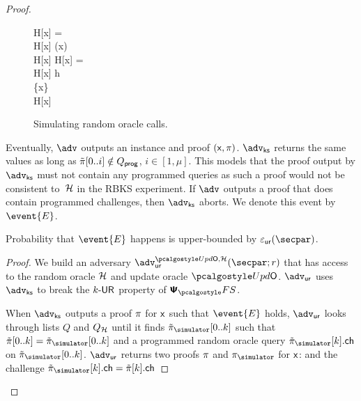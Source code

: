 \begin{proof}
	
	\begin{figure}
		\centering
			\begin{pcvstack}
			\begin{pchstack}
				{
				\pcif H[x] = \bot \pcthen \\
				\pcind H[x] \gets \ro(x) \\
				\pcreturn H[x]
		  		}
				\pchspace
				{ 
					\pcif H[x] = \bot \pcthen \\ 
					\pcind H[x] \gets h \\
					\pcind \Qprog \gets \Qprog \cup \{x\}\\
					\pcreturn H[x]
				}
			\end{pchstack}
		\end{pcvstack}
		\caption{Simulating random oracle calls.}
		\label{fig:simulator_oracles}
	\end{figure}	
%

	Eventually, $\advse$ outputs an instance and proof $(\mathsf{x}, \pi)$. $\advcss$ returns the same values as long as $\tilde{\pi}[0..i] \notin Q_{\mathsf{prog}}$, $i\in[1,\mu]$. This models that the proof output by $\advcss$ must not contain any programmed queries as such a proof would not be consistent to~$\mathcal{H}$ in the RBKS experiment. If $\advse$ outputs a proof that does contain programmed challenges, then $\advcss$ aborts. We denote this event by $\event{E}$.
	
	\begin{lemma}
		Probability that $\event{E}$ happens is upper-bounded by $\epsur(\secpar)$. 
	\end{lemma}
	\begin{proof}

	We build an adversary $\advur^{\initU, \ro} (\secpar; r)$ that has access to the random oracle $\mathcal{H}$ and update oracle $\initU$. $\advur$ uses $\advcss$ to break the ${k\text{-}\mathsf{UR}}$ property of $\psfs$. 

	When $\advcss$ outputs a proof $\pi$ for $\mathsf{x}$ such that $\event{E}$ holds, $\advur$ looks through lists $Q$ and $Q_{\mathcal{H}}$ until it finds $\tzkproofs[0..k]$ such that $\tzkproof[0..k] = \tzkproofs[0..k]$ and a programmed random oracle query $\tzkproofs[k].\ch$ on $\tzkproofs[0..k]$.	$\advur$ returns two proofs $\pi$ and $\zkproofs$ for $\mathsf{x}$:
		and the challenge $\tzkproofs[k].\ch=\tzkproof[k].\ch$


\end{proof}
\end{proof}
